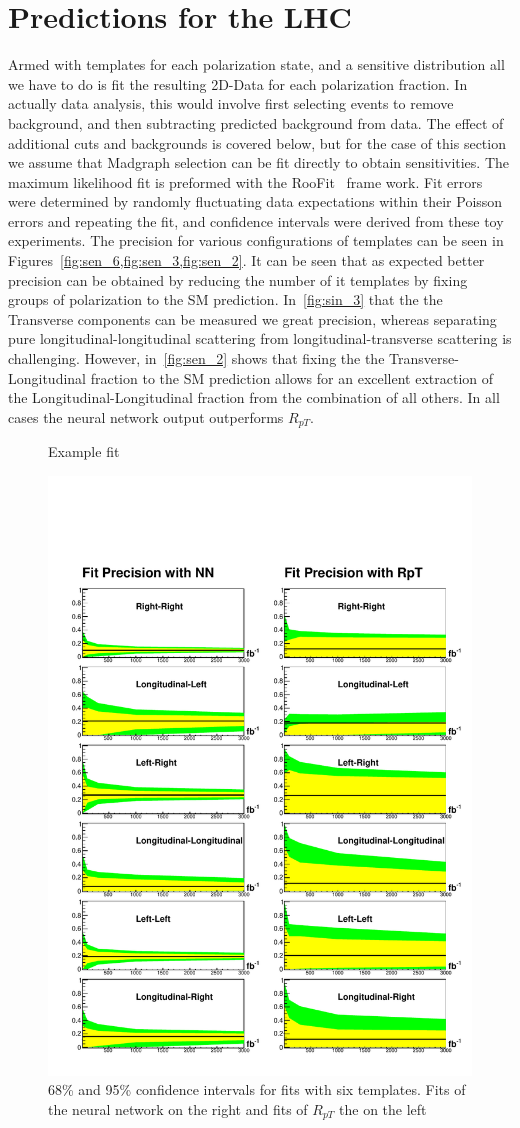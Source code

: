 \documentclass[10pt,twocolumn]{article}
\begin{document}
\section{Predictions for the LHC}

Armed with templates for each polarization state, and a sensitive distribution all we have to do is fit the resulting 2D-Data for each polarization fraction. In actually data analysis, this would involve
first selecting events to remove background, and then subtracting predicted background from data. The effect of additional cuts and backgrounds is covered below, but for the case of this section we assume that 
Madgraph selection can be fit directly to obtain sensitivities. The maximum likelihood fit is preformed with the RooFit~\cite{} frame work. Fit errors were determined by randomly fluctuating data expectations within their Poisson errors and repeating the fit, and confidence intervals were derived from these toy experiments. The precision for various configurations of templates can be seen in Figures~\ref{fig:sen_6,fig:sen_3,fig:sen_2}.  It can be seen that as expected better precision can be obtained by reducing the number of it templates by fixing groups of polarization to the SM prediction. In~\ref{fig:sin_3} that the the Transverse components can be measured we great precision, whereas separating pure longitudinal-longitudinal scattering from longitudinal-transverse scattering is challenging. However, in~\ref{fig:sen_2} shows that fixing the the Transverse-Longitudinal fraction to the SM prediction allows for an excellent extraction of the Longitudinal-Longitudinal fraction from the combination of all others. In all cases the neural network output outperforms $R_{pT}$.


\begin{figure}
Example fit
\end{figure}



\begin{figure}
\includegraphics[width=.45\textwidth]{./fig/sens_0.pdf}
\caption{\label{fig:sen_6} 68\% and 95\% confidence intervals for fits with six templates. Fits of the neural network on the right and fits of $R_{pT}$ the on the left}
\end{figure}
\end{document}
